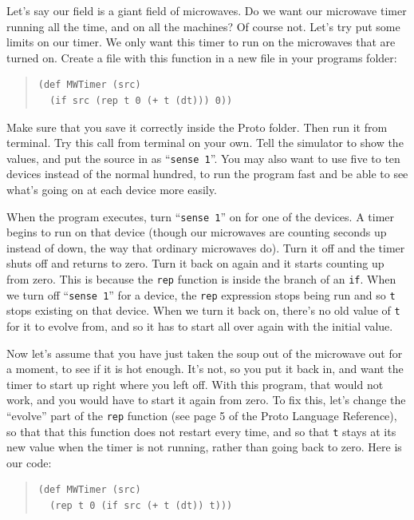 \documentclass{article}
\newcommand\var[1]{{\tt #1}}
\newcommand\qvar[1]{``{\tt #1}''}
\begin{document}
Let's say our field is a giant field of microwaves.  Do we want our
microwave timer running all the time, and on all the machines?  Of
course not.  Let's try put some limits on our timer.  We only want
this timer to run on the microwaves that are turned on.  Create a file
with this function in a new file in your programs folder:

\begin{quote}
\begin{verbatim}
(def MWTimer (src)
  (if src (rep t 0 (+ t (dt))) 0))
\end{verbatim}
\end{quote}

Make sure that you save it correctly inside the Proto folder. Then run
it from terminal.  Try this call from terminal on your own.  Tell the
simulator to show the values, and put the source in as \qvar{sense 1}.
You may also want to use five to ten devices instead of the normal
hundred, to run the program fast and be able to see what's going on at
each device more easily.

When the program executes, turn \qvar{sense 1} on for one of the
devices.  A timer begins to run on that device (though our microwaves
are counting seconds up instead of down, the way that ordinary
microwaves do).  Turn it off and the timer shuts off and returns to
zero.  Turn it back on again and it starts counting up from zero.
This is because the \var{rep} function is inside the branch of an
\var{if}.  When we turn off \qvar{sense 1} for a device, the \var{rep}
expression stops being run and so \var{t} stops existing on that
device.  When we turn it back on, there's no old value of \var{t} for
it to evolve from, and so it has to start all over again with the
initial value.

Now let's assume that you have just taken the soup out of the
microwave out for a moment, to see if it is hot enough.  It's not, so
you put it back in, and want the timer to start up right where you
left off.  With this program, that would not work, and you would have
to start it again from zero.  To fix this, let's change the ``evolve''
part of the \var{rep} function (see page 5 of the Proto Language
Reference), so that that this function does not restart every time,
and so that \var{t} stays at its new value when the timer is not
running, rather than going back to zero. Here is our code:

\begin{quote}
\begin{verbatim}
(def MWTimer (src) 
  (rep t 0 (if src (+ t (dt)) t)))
\end{verbatim}
\end{quote}
\end{document}
